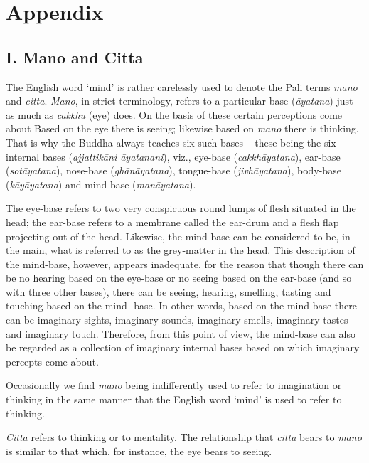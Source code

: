 \chapter{Appendix}

\hypertarget{_i_mano_and_citta}{%
\section{I. Mano and Citta}\label{_i_mano_and_citta}}

 The English word `mind' is rather carelessly used to denote the Pali terms \emph{mano} and \emph{citta}. \emph{Mano}, in strict terminology, refers to a particular base (\emph{āyatana}) just as much as \emph{cakkhu} (eye) does. On the basis of these certain perceptions come about Based on the eye there is seeing; likewise based on \emph{mano} there is thinking. That is why the Buddha always teaches six such bases -- these being the six internal bases (\emph{ajjattikāni āyatanani}), viz., eye-base (\emph{cakkhāyatana}), ear-base (\emph{sotāyatana}), nose-base (\emph{ghānāyatana}), tongue-base (\emph{jivhāyatana}), body-base (\emph{kāyāyatana}) and mind-base (\emph{manāyatana}).

The eye-base refers to two very conspicuous round lumps of flesh situated in the head; the ear-base refers to a membrane called the ear-drum and a flesh flap projecting out of the head. Likewise, the mind-base can be considered to be, in the main, what is referred to as the grey-matter in the head. This description of the mind-base, however, appears inadequate, for the reason that though there can be no hearing based on the eye-base or no seeing based on the ear-base (and so with three other bases), there can be seeing, hearing, smelling, tasting and touching based on the mind- base. In other words, based on the mind-base there can be imaginary sights, imaginary sounds, imaginary smells, imaginary tastes and imaginary touch. Therefore, from this point of view, the mind-base can also be regarded as a collection of imaginary internal bases based on which imaginary percepts come about.

Occasionally we find \emph{mano} being indifferently used to refer to imagination or thinking in the same manner that the English word `mind' is used to refer to thinking.

 \emph{Citta} refers to thinking or to mentality. The relationship that \emph{citta} bears to \emph{mano} is similar to that which, for instance, the eye bears to seeing.

